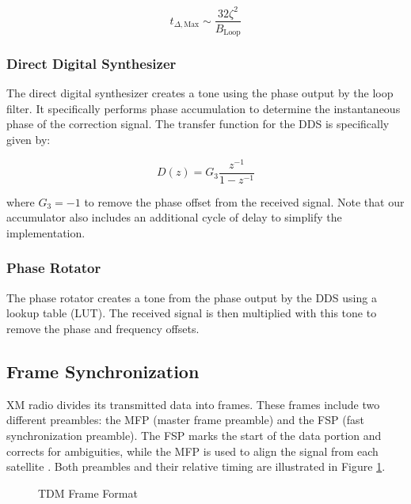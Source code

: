 \documentclass[conference,onecolumn]{IEEEtran}
\begin{document}
\begin{equation}
	t_{\Delta,\text{Max}} \sim \frac{32\zeta^2}{B_\text{Loop}}\end{equation}

\subsubsection{Direct Digital Synthesizer}

The direct digital synthesizer creates a tone using the phase output by the loop filter. It specifically performs phase accumulation to determine the instantaneous phase of the correction signal. The transfer function for the DDS is specifically given by:

\begin{equation}
	D(z) = G_3\frac{z^{-1}}{1 - z^{-1}}
\end{equation}

\noindent where $G_3 = -1$ to remove the phase offset from the received signal. Note that our accumulator also includes an additional cycle of delay to simplify the implementation.

\subsubsection{Phase Rotator}

The phase rotator creates a tone from the phase output by the DDS using a lookup table (LUT). The received signal is then multiplied with this tone to remove the phase and frequency offsets.

\subsection{Frame Synchronization}

XM radio divides its transmitted data into frames. These frames include two different preambles: the MFP (master frame preamble) and the FSP (fast synchronization preamble). The FSP marks the start of the data portion and corrects for ambiguities, while the MFP is used to align the signal from each satellite \cite{a2008_us8260192b2}. Both preambles and their relative timing are illustrated in Figure \ref{fig::tdm_frame_format}.

\begin{figure}[H]
	\centerline{}
	\caption{TDM Frame Format \cite{a2008_us8260192b2}}
	\label{fig::tdm_frame_format}
\end{figure}
\end{document}
